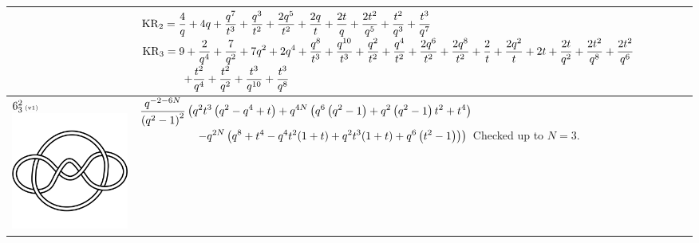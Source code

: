 \documentclass{compositio}
\theoremstyle{definition}
\numberwithin{equation}{section}
\begin{document}
{\begin{longtable}{p{}|p{}}
& 
$
\displaystyle{%
\KR_{2} = \frac{4}{q}+4 q+\frac{q^7}{t^3}+\frac{q^3}{t^2}+\frac{2 q^5}{t^2}+\frac{2 q}{t}+\frac{2 t}{q}+\frac{2 t^2}{q^5}+\frac{t^2}{q^3}+\frac{t^3}{q^7}
}
$
\newline 
$
\displaystyle{%
\KR_{3} = 9+\frac{2}{q^4}+\frac{7}{q^2}+7 q^2+2 q^4+\frac{q^8}{t^3}+\frac{q^{10}}{t^3}+\frac{q^2}{t^2}+\frac{q^4}{t^2}+\frac{2 q^6}{t^2}+\frac{2 q^8}{t^2}+\frac{2}{t}+\frac{2 q^2}{t}+2 t+\frac{2 t}{q^2}+\frac{2 t^2}{q^8}+\frac{2 t^2}{q^6}
}
$
\newline
$
\displaystyle{%
\qquad\qquad +\frac{t^2}{q^4}+\frac{t^2}{q^2}+\frac{t^3}{q^{10}}+\frac{t^3}{q^8}
}
$
\\
\hline
$6_{3}^2\,\text{{\tiny (v1)}}$ 
\includegraphics[scale=0.07,angle=0]{link6_3_2.pdf} 
& 
$
\displaystyle{%
\frac{q^{-2-6 N}}{\left(q^2-1\right)^2} \left(q^2 t^3 \left(q^2-q^4+t\right)+q^{4 N} \left(q^6 \left(q^2-1\right)+q^2 \left(q^2-1\right) t^2+t^4\right) \right.
}
$
\newline
$
\displaystyle{%
\left. \qquad\qquad\quad -q^{2 N} \left(q^8+t^4-q^4 t^2 (1+t)+q^2 t^3 (1+t)+q^6 \left(t^2-1\right)\right)\right)
}
$
\newline\newline
Checked up to $N=3$.
\\
\hline

\end{longtable}}
\end{document}
